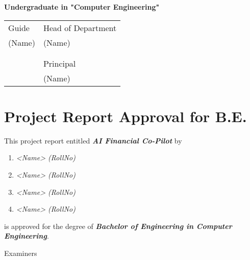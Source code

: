 \documentclass[11pt,a4paper]{report}
\begin{document}
\vspace{0.3cm}

\begin{center}
    {\bfseries Undergraduate in "Computer Engineering"}
\end{center}

\vspace{2cm}

\begin{flushleft}
\begin{tabular}{@{}ll}
Guide & Head of Department\\
(Name) & (Name)\\
\\
\\
& Principal\\
& (Name)
\end{tabular}
\end{flushleft}

\newpage

\chapter*{Project Report Approval for B.E.}
\thispagestyle{empty}

\vspace{1cm}

This project report entitled \textbf{\textit{AI Financial Co-Pilot}} by

\vspace{0.5cm}

\begin{enumerate}
    \item \textit{<Name> (RollNo)}
    \item \textit{<Name> (RollNo)}
    \item \textit{<Name> (RollNo)}
    \item \textit{<Name> (RollNo)}
\end{enumerate}

\vspace{0.5cm}

is approved for the degree of \textit{\textbf{Bachelor of Engineering in Computer Engineering}}.

\vspace{2cm}

\noindent Examiners

\vspace{0.5cm}
\end{document}
